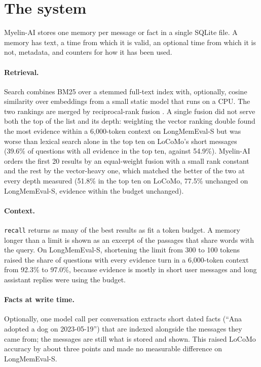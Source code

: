 \documentclass[11pt]{article}
\begin{document}
\section{The system}
\label{sec:system}

\mbox{Myelin-AI} stores one memory per message or fact in a single SQLite file.
A memory has text, a time from which it is valid, an optional time
from which it is not, metadata, and counters for how it has been used.

\paragraph{Retrieval.} Search combines BM25 \citep{robertson2009bm25}
over a stemmed full-text index with, optionally, cosine similarity over
embeddings from a small static model that runs on a CPU. The two
rankings are merged by reciprocal-rank fusion \citep{cormack2009rrf}.
A single fusion did not serve both the top of the list and its depth:
weighting the vector ranking double found the most evidence within a
6{,}000-token context on LongMemEval-S but was worse than lexical
search alone in the top ten on LoCoMo's short messages (39.6\% of
questions with all evidence in the top ten, against 54.9\%). \mbox{Myelin-AI}
orders the first 20 results by an equal-weight fusion with a small rank
constant and the rest by the vector-heavy one, which matched the better
of the two at every depth measured (51.8\% in the top ten on LoCoMo,
77.5\% unchanged on LongMemEval-S, evidence within the budget
unchanged).

\paragraph{Context.} \texttt{recall} returns as many of the best
results as fit a token budget. A memory longer than a limit is shown
as an excerpt of the passages that share words with the query. On
LongMemEval-S, shortening the limit from 300 to 100 tokens raised the
share of questions with every evidence turn in a 6{,}000-token context
from 92.3\% to 97.0\%, because evidence is mostly in short user
messages and long assistant replies were using the budget.

\paragraph{Facts at write time.} Optionally, one model call per
conversation extracts short dated facts (``Ana adopted a dog on
2023-05-19'') that are indexed alongside the messages they came from;
the messages are still what is stored and shown. This raised LoCoMo
accuracy by about three points and made no measurable difference on
LongMemEval-S.
\end{document}
